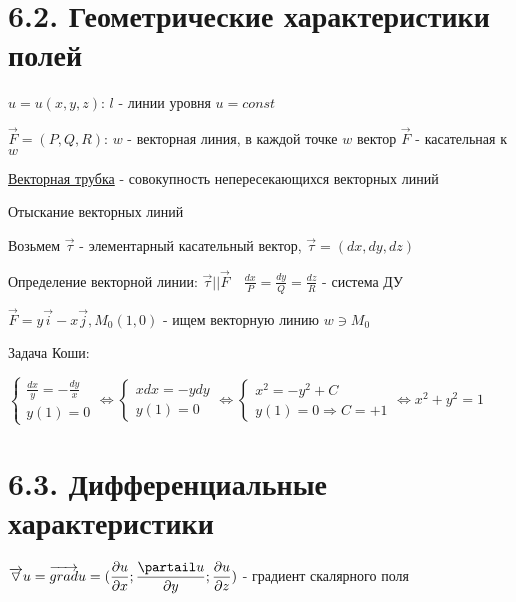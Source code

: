 \documentclass[12pt]{article}
\begin{document}
    \section{6.2. Геометрические характеристики полей}

    $u = u(x, y, z)$: $l$ - линии уровня $u = const$

    $\overrightarrow{F} = (P, Q, R)$: $w$ - векторная линия, в каждой точке $w$ вектор $\overrightarrow{F}$ - касательная к $w$

    \underline{Векторная трубка} - совокупность непересекающихся векторных линий

    \Nota Отыскание векторных линий

    Возьмем $\overrightarrow{\tau}$ - элементарный касательный вектор, $\overrightarrow{\tau} = (dx, dy, dz)$

    Определение векторной линии: $\displaystyle \overrightarrow{\tau} || \overrightarrow{F} \quad \frac{dx}{P} = \frac{dy}{Q} = \frac{dz}{R}$ - система ДУ

    \Ex $\displaystyle \overrightarrow{F} = y \overrightarrow{i} - x \overrightarrow{j}, M_0 (1, 0)$ - ищем векторную линию $\displaystyle w \ni M_0$

    Задача Коши:

    $\displaystyle \begin{cases}
         \frac{dx}{y} = -\frac{dy}{x} \\
         y(1) = 0
    \end{cases} \Longleftrightarrow \begin{cases}
                                        xdx = -ydy \\
                                        y(1) = 0
    \end{cases} \Longleftrightarrow \begin{cases}
                                        x^2 = -y^2 + C \\
                                        y(1) = 0 \Longrightarrow C = +1
    \end{cases} \Longleftrightarrow x^2 + y^2 = 1 $


    \section{6.3. Дифференциальные характеристики}

    \Mem $\displaystyle \overrightarrow{\triangledown}u = \overrightarrow{grad}u = (\frac{\partial u}{\partial x}; \frac{\partail u}{\partial y}; \frac{\partial u}{\partial z})$ - градиент скалярного поля
\end{document}
